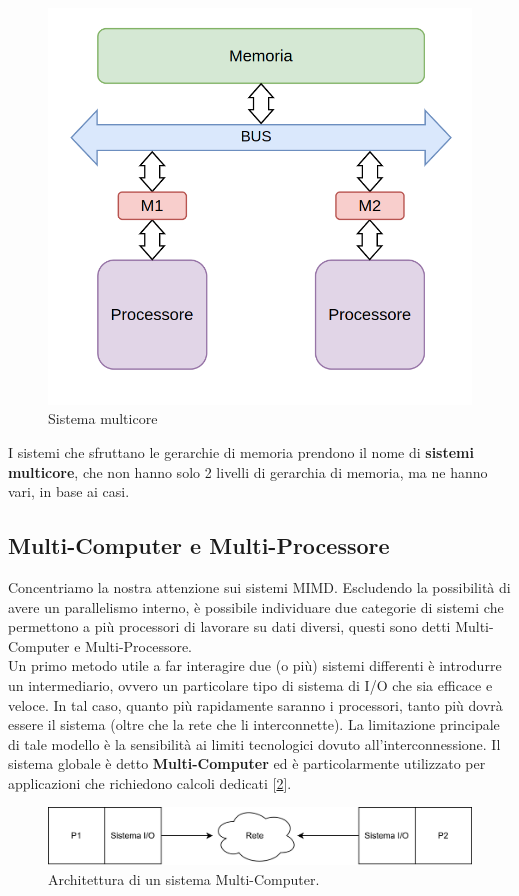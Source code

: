 \begin{figure}
    \centering
    \includegraphics[width=.5\textwidth]{img/P-M-BUS-M-P.png}
    \caption{Sistema multicore}\label{img:multi-core}
\end{figure}

I sistemi che sfruttano le gerarchie di memoria prendono il nome di \textbf{sistemi multicore}, che non hanno solo 2 livelli di gerarchia di memoria, ma ne hanno vari, in base ai casi.

\newpage
\subsection{Multi-Computer e Multi-Processore}
Concentriamo la nostra attenzione sui sistemi MIMD. Escludendo la possibilità di avere un parallelismo interno, è possibile individuare due categorie di sistemi che permettono a più processori di lavorare su dati diversi, questi sono detti Multi-Computer e Multi-Processore.
\\
Un primo metodo utile a far interagire due (o più) sistemi differenti è introdurre un intermediario, ovvero un particolare tipo di sistema di I/O che sia efficace e veloce. In tal caso, quanto più rapidamente saranno i processori, tanto più dovrà essere il sistema (oltre che la rete che li interconnette). La limitazione principale di tale modello è la sensibilità ai limiti tecnologici dovuto all'interconnessione. Il sistema globale è detto \textbf{Multi-Computer} ed è particolarmente utilizzato per applicazioni che richiedono calcoli dedicati [\ref{fig:multi-computer}].
\begin{figure}[!h]
    \centering
    \includegraphics[width=0.8\linewidth]{img/multi-processore.png}
    \caption{Architettura di un sistema Multi-Computer.}
    \label{fig:multi-computer}
\end{figure}


